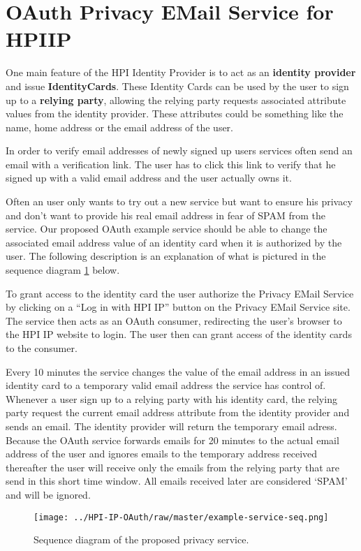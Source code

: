 \section{OAuth Privacy EMail Service for HPIIP}

One main feature of the HPI Identity Provider is to act as an
\textbf{identity provider} and issue \textbf{IdentityCards}. These
Identity Cards can be used by the user to sign up to a
\textbf{relying party}, allowing the relying party requests
associated attribute values from the identity provider. These
attributes could be something like the name, home address or the
email address of the user.

In order to verify email addresses of newly signed up users services
often send an email with a verification link. The user has to click
this link to verify that he signed up with a valid email address
and the user actually owns it.

Often an user only wants to try out a new service but want to
ensure his privacy and don't want to provide his real email address
in fear of SPAM from the service. Our proposed OAuth example
service should be able to change the associated email address value
of an identity card when it is authorized by the user. The following
description is an explanation of what is pictured in the sequence diagram \ref{seq-diagram} below. 

To grant access to the identity card the user authorize the Privacy
EMail Service by clicking on a ``Log in with HPI IP'' button on the
Privacy EMail Service site. The service then acts as an OAuth
consumer, redirecting the user's browser to the HPI IP website to
login. The user then can grant access of the identity cards to the
consumer.

Every 10 minutes the service changes the value of the email address in an issued
identity card to a temporary valid email address
the service has control of. Whenever a user sign up to a relying
party with his identity card, the relying party request the current
email address attribute from the identity provider and sends an
email. The identity provider will return the temporary email
adress. Because the OAuth service forwards emails for 20 minutes to
the actual email address of the user and ignores emails to the
temporary address received thereafter the user will receive only
the emails from the relying party that are send in this short time
window. All emails received later are considered `SPAM' and will be
ignored.

\begin{figure}
	\label{seq-diagram} 
	\centering
	\texttt{[image: ../HPI-IP-OAuth/raw/master/example-service-seq.png]}
	\caption{Sequence diagram of the proposed privacy service.}  
\end{figure}


